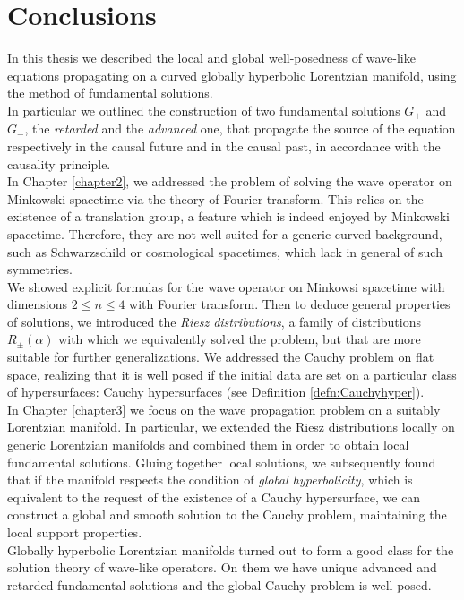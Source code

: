 \chapter*{Conclusions}
\label{conclusions}
\thispagestyle{plain}
In this thesis we described the local and global well-posedness of wave-like equations propagating on a curved globally hyperbolic Lorentzian manifold, using the method of fundamental solutions.\\

\noindent In particular we outlined the construction of two fundamental solutions $G_+$ and $G_-$, the \emph{retarded} and the \emph{advanced} one, that propagate the source of the equation respectively in the causal future and in the causal past, in accordance with the causality principle.\\
In Chapter \ref{chapter2}, we addressed the problem of solving the wave operator on Minkowski spacetime via the theory of Fourier transform. This relies on the existence of a translation group, a feature which is indeed enjoyed by Minkowski spacetime. Therefore, they are not well-suited for a generic curved background, such as Schwarzschild or cosmological spacetimes, which lack in general of such symmetries.\\
We showed explicit formulas for the wave operator on Minkowsi spacetime with dimensions $2\leq n\leq 4$ with Fourier transform. Then to deduce general properties of solutions, we introduced the \emph{Riesz distributions}, a family of distributions $R_\pm(\alpha)$ with which we equivalently solved the problem, but that are more suitable for further generalizations.
We addressed the Cauchy problem on flat space, realizing that it is well posed if the initial data are set on a particular class of hypersurfaces: Cauchy hypersurfaces (see Definition \ref{defn:Cauchyhyper}).\\
\noindent In Chapter \ref{chapter3} we focus on the wave propagation problem on a suitably Lorentzian manifold. In particular, we extended the Riesz distributions locally on generic Lorentzian manifolds and combined them in order to obtain local fundamental solutions. Gluing together local solutions, we subsequently found that if the manifold respects the condition of \emph{global hyperbolicity}, which is equivalent to the request of the existence of a Cauchy hypersurface, we can construct a global and smooth solution to the Cauchy problem, maintaining the local support properties.\\
Globally hyperbolic Lorentzian manifolds turned out to form a good class for the solution theory of wave-like operators. On them we have unique advanced and retarded fundamental solutions and the global Cauchy problem is well-posed.\\[1.5cm]




